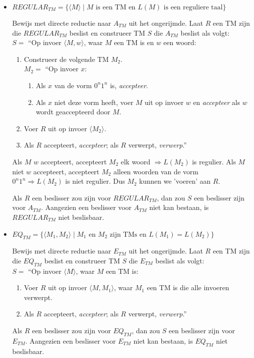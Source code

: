 \documentclass[]{article}
\begin{document}
\begin{itemize}
	
	\item $REGULAR_{TM} = \{ \langle M \rangle \mid M \mbox{ is een TM en $L(M)$ is een reguliere taal} \}$

	Bewijs met directe reductie naar $A_{TM}$ uit het ongerijmde.
	Laat $R$ een TM zijn die $REGULAR_{TM}$ beslist en construeer TM $S$ die $A_{TM}$ beslist als volgt: \\
	$S = $ ``Op invoer $\langle M, w \rangle$, waar $M$ een TM is en $w$ een woord:
	\begin{enumerate}
		\item Construeer de volgende TM $M_2$. \\
		$M_2 = $ ``Op invoer $x$:
		\begin{enumerate}[1.]
			\item Als $x$ van de vorm $0^n1^n$ is, \emph{accepteer}.
			\item Als $x$ niet deze vorm heeft, voer $M$ uit op invoer $w$ en \emph{accepteer} als $w$ wordt geaccepteerd door $M$. 
		\end{enumerate}
		\item Voer $R$ uit op invoer $\langle M_2 \rangle$.
		\item Als $R$ accepteert, \emph{accepteer}; als $R$ verwerpt, \emph{verwerp}.''
	\end{enumerate}
	
	Als $M$ $w$ accepteert, accepteert $M_2$ elk woord $\Rightarrow L(M_2)$ is regulier. Als $M$ niet $w$ accepteert, accepteert $M_2$ alleen woorden van de vorm $0^n1^n \Rightarrow L(M_2)$ is niet regulier. Dus $M_2$ kunnen we 'voeren' aan $R$.
	
	Als $R$ een beslisser zou zijn voor $REGULAR_{TM}$, dan zou $S$ een beslisser zijn voor $A_{TM}$. Aangezien een beslisser voor $A_{TM}$ niet kan bestaan, is $REGULAR_{TM}$ niet beslisbaar.
		
	
	\item $EQ_{TM} = \{ \langle M_1, M_2 \rangle \mid \mbox{$M_1$ en $M_2$ zijn TMs en } L(M_1) = L(M_2) \}$
	
	Bewijs met directe reductie naar $E_{TM}$ uit het ongerijmde.
	Laat $R$ een TM zijn die $EQ_{TM}$ beslist en construeer TM $S$	 die $E_{TM}$ beslist als volgt: \\
	$S = $ ``Op invoer $\langle M \rangle$, waar $M$ een TM is:
	\begin{enumerate}
		\item Voer $R$ uit op invoer $\langle M, M_1 \rangle$, waar $M_1$ een TM is die alle invoeren verwerpt.
		\item Als $R$ accepteert, \emph{accepteer}; als $R$ verwerpt, \emph{verwerp}.''
	\end{enumerate}
	Als $R$ een beslisser zou zijn voor $EQ_{TM}$, dan zou $S$ een beslisser zijn voor $E_{TM}$. Aangezien een beslisser voor $E_{TM}$ niet kan bestaan, is $EQ_{TM}$ niet beslisbaar.
	

\end{itemize}
\end{document}
